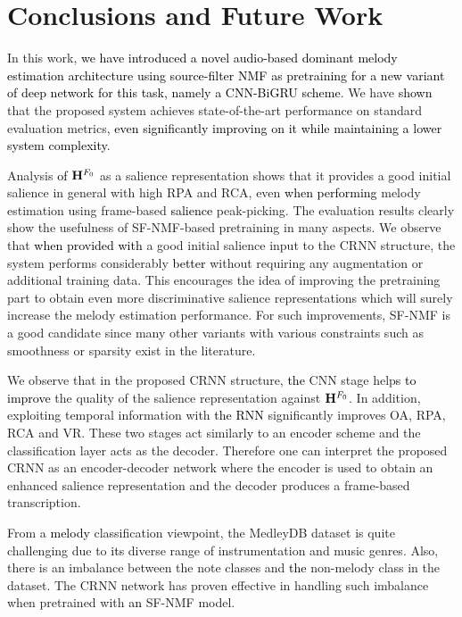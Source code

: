 \documentclass{article}
\newcommand{\gp}[1]{{\textcolor{black}{#1}}}
\newcommand{\se}[1]{{\textcolor{black}{#1}}}
\newcommand{\secor}[2]{{\textcolor{black}{#2}}}
\newcommand{\jb}[1]{{\textcolor{black}{#1}}}
\newcommand{\jbcor}[2]{{\textcolor{black}{#2}}}
\begin{document}
\section{Conclusions and Future Work} \label{sec:Conclusion}

In this work, \se{we have introduced a novel audio-based dominant melody estimation architecture using
source-filter NMF as \jbcor{a pre-training}{pretraining} for a new variant of deep network for this task, namely a CNN-BiGRU scheme}. We have \jbcor{showed}{shown} that the proposed system achieves state-of-the-art performance on standard evaluation metrics, \se{even significantly improving \jb{on} it while maintaining a lower system complexity}. 

Analysis \jbcor{on}{of} $\mathbf{H}^{F_{0}}$ as a salience representation shows that it provides a good initial salience in general with high RPA and RCA, even \secor{with}{when performing} melody estimation using frame-based \se{salience} peak-picking. The evaluation results clearly show the usefulness of SF-NMF-based pretraining in many aspects. We observe that \jbcor{provided}{when provided with} a good initial salience input to the CRNN structure, the system performs considerably \jbcor{well}{better} without requiring any augmentation or additional training data. This encourages the idea of improving the pretraining part to obtain even more discriminative salience representations which will surely increase the melody estimation performance. For such improvements, SF-NMF is a good candidate since many other variants with various constraints such as smoothness or sparsity exist in the literature. 

We observe that in the proposed CRNN structure, \jb{the} CNN stage help\gp{s} \jbcor{improving}{to improve} the quality of the salience representation against $\mathbf{H}^{F_{0}}$. In addition,
exploiting temporal information with \jbcor{RNN stage}{the RNN} significantly improves OA, RPA, RCA and VR. These two stages act similar\jb{ly} to an encoder scheme and the classification layer acts as the decoder. Therefore one can interpret the proposed CRNN as an encoder-decoder \jbcor{type of}{} network where the encoder is used to obtain an enhanced salience representation and the decoder produces a frame-based transcription.

From a \se{melody} classification viewpoint, the MedleyDB dataset is quite challenging due to \jb{its} diverse range of instrumentation and music genres. \jbcor{involved.}{} Also, there is an imbalance between the note classes and \jbcor{between}{the} non-melody class in the \jbcor{MedleyDB}{} dataset. The CRNN network has proven effective in handling such imbalance when pretrained with \jb{an} SF-NMF model. 
\end{document}
